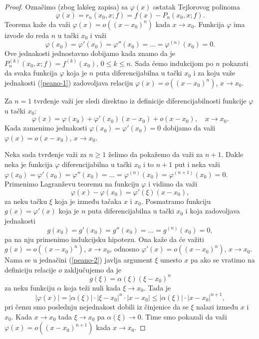 \documentclass[a4paper,12pt]{article}
\theoremstyle{plain}
\theoremstyle{definition}
\theoremstyle{remark}
\begin{document}
\begin{proof}
Označimo (zbog lakšeg zapisa) sa $\varphi(x)$ ostatak Tejlorovog polinoma
$$
\varphi(x) = r_n(x_0, x; f) = f(x) - P_n(x_0, x; f).
$$
Teorema kaže da važi $\varphi(x) = o((x - x_0)^n)$ kada $x \to x_0$. Funkcija $\varphi$ ima izvode do reda $n$ u tački $x_0$ i važi
\begin{equation}
\varphi(x_0) = \varphi'(x_0) = \varphi''(x_0) = \dots = \varphi^{(n)}(x_0) = 0.
\label{peano-1}
\end{equation}
Ove jednakosti jednostavno dobijamo kada znamo da je $P_n^{(k)}(x_0, x; f) = f^{(k)}(x_0)$, $0 \leq k \leq n$.
Sada ćemo indukcijom po $n$ pokazati da svaka funkcija $\varphi$ koja je $n$ puta diferencijabilna u tački $x_0$ i za koju važe jednakosti (\ref{peano-1}) zadovoljava relaciju $\varphi(x) = o((x - x_0)^n)$, $x \to x_0$.

Za $n = 1$ tvrđenje važi jer sledi direktno iz definicije diferencijabilnosti funkcije $\varphi$ u tački $x_0$:
$$
\varphi(x) = \varphi(x_0) + \varphi'(x_0)(x - x_0) + o(x - x_0), \quad x \to x_0.
$$
Kada zamenimo jednakosti $\varphi(x_0) = \varphi'(x_0) = 0$ dobijamo da važi $\varphi(x) = o(x - x_0)$, $x \to x_0$.

Neka sada tvrđenje važi za $n \geq 1$ želimo da pokažemo da važi za $n + 1$. Dakle neka je funkcija $\varphi$ diferencijabilna u tački $x_0$ i to $n + 1$ put i neka važi $\varphi(x_0) = \varphi'(x_0) = \varphi''(x_0) = \dots = \varphi^{(n)}(x_0) = \varphi^{(n+1)}(x_0) = 0$. Primenimo Lagranževu teoremu na funkciju $\varphi$ i vidimo da važi
\begin{equation}
\varphi(x) - \varphi(x_0) = \varphi'(\xi)(x - x_0),
\label{peano-2}
\end{equation}
za neku tačku $\xi$ koja je između tačaka $x$ i $x_0$. Posmatramo funkciju $g(x) = \varphi'(x)$ koja je $n$ puta diferencijabilna u tački $x_0$ i koja zadovoljava jednakosti
$$
g(x_0) = g'(x_0) = g''(x_0) = \dots = g^{(n)}(x_0) = 0,
$$
pa na nju primenimo indukcijsku hipotezu. Ona kaže da će važiti $g(x) = o((x - x_0)^n)$, $x \to x_0$, odnosno $\varphi'(x) = o((x - x_0)^n)$, $x \to x_0$. Nama se u jednačini (\ref{peano-2}) javlja argument $\xi$ umesto $x$ pa ako se vratimo na definiciju relacije $o$ zaključujemo da je
$$
g(\xi) = \alpha(\xi)(\xi - x_0)^n
$$
za neku funkciju $\alpha$ koja teži nuli kada $\xi \to x_0$. Tada je
$$
|\varphi(x)| = |\alpha(\xi)| \cdot |\xi - x_0|^n \cdot |x - x_0| \leq |\alpha(\xi)| \cdot |x - x_0|^{n+1},
$$
pri čemu smo poslednju nejednakost dobili iz činjenice da se $\xi$ nalazi između $x$ i $x_0$. Kada $x \to x_0$ tada $\xi \to x_0$ pa $\alpha(\xi) \to 0$. Time smo pokazali da važi $\varphi(x) = o((x - x_0)^{n+1})$ kada $x \to x_0$.
\end{proof}
\end{document}
